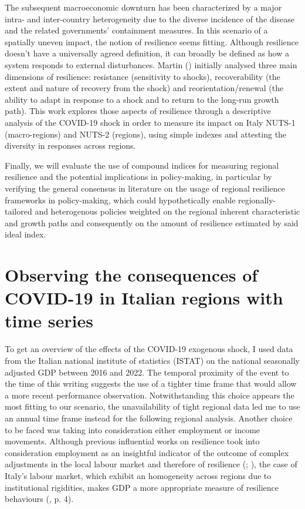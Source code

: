\documentclass[12pt]{article}
\begin{document}
The subsequent macroeconomic downturn has been characterized by a major intra- and inter-country heterogeneity due to the diverse incidence of the disease and the related governments’ containment measures.
In this scenario of a spatially uneven impact, the notion of resilience seems fitting. Although resilience doesn't have a universally agreed definition, it can broadly be defined as how a system responds to external disturbances. Martin (\citeyear{martin_regional_2012}) initially analysed three main dimensions of resilience: resistance (sensitivity to shocks), recoverability (the extent and nature of recovery from the shock) and reorientation/renewal (the ability to adapt in response to a shock and to return to the long-run growth path).
This work explores those aspects of resilience through a descriptive analysis of the COVID-19 shock in order to measure its impact on Italy NUTS-1 (macro-regions) and NUTS-2 (regions), using simple indexes and attesting the diversity in responses across regions. 

Finally, we will evaluate the use of compound indices for measuring regional resilience and the potential implications in policy-making, in particular by verifying the general consensus in literature on the usage of regional resilience frameworks in policy-making, which could hypothetically enable regionally-tailored and heterogenous policies weighted on the regional inherent characteristic and growth paths and consequently on the amount of resilience estimated by said ideal index.

\section{Observing the consequences of COVID-19 in Italian regions with time series}

To get an overview of the effects of the COVID-19 exogenous shock, I used data from the Italian national institute of statistics (ISTAT) on the national seasonally adjusted GDP between 2016 and 2022. The temporal proximity of the event to the time of this writing suggests the use of a tighter time frame that would allow a more recent performance observation. Notwithstanding this choice appears the most fitting to our scenario, the unavailability of tight regional data led me to use an annual time frame instead for the following regional analysis. Another choice to be faced was taking into consideration either employment or income movements. Although previous influential works on resilience took into consideration employment as an insightful indicator of the outcome of complex adjustments in the local labour market and therefore of resilience (\cite{martin_regional_2012}; \cite{fingleton_recessionary_2012}), the case of Italy's labour market, which exhibit an homogeneity across regions due to institutional rigidities, makes GDP a more appropriate measure of resilience behaviours (\cite{cellini_regional_2014}, p. 4).
\end{document}
